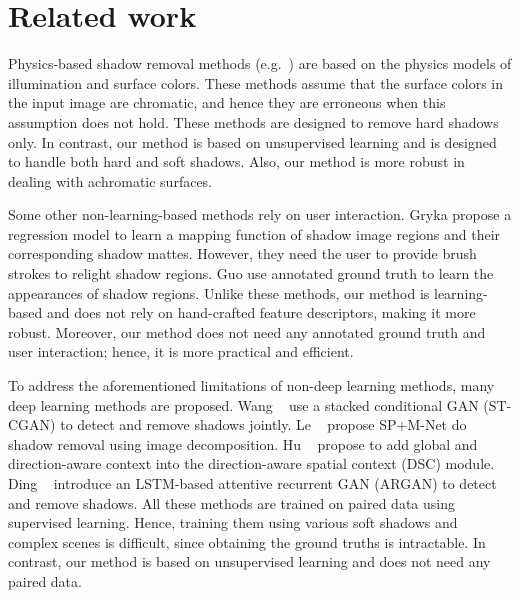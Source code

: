 \documentclass[10pt,twocolumn,letterpaper]{article}
\begin{document}
\section{Related work}
\label{sec:related}
Physics-based shadow removal methods (e.g.~\cite{Finlayson01,Drew03,Finlayson04,Finlayson05,Finlayson09}) are based on the physics models of illumination and surface colors. 
These methods assume that the surface colors in the input image are chromatic, and hence they are erroneous when this assumption does not hold. 
These methods are designed to remove hard shadows only. 
In contrast, our method is based on unsupervised learning and is designed to handle both hard and soft shadows. 
Also, our method is more robust in dealing with achromatic surfaces.

Some other non-learning-based methods rely on user interaction. Gryka \etal \cite{Gryka15} propose a regression model to learn a mapping function of shadow image regions and their corresponding shadow mattes. However, they need the user to provide brush strokes to relight shadow regions.  
Guo \etal \cite{Guo11,Guo12} use annotated ground truth to learn the appearances of shadow regions. 
Unlike these methods, our method is learning-based and does not rely on hand-crafted feature descriptors, making it more robust. Moreover, our method does not need any annotated ground truth and user interaction; hence, it is more practical and efficient.


To address the aforementioned limitations of non-deep learning methods, many deep learning methods are proposed. Wang \etal~\cite{Wang18} use a stacked conditional GAN (ST-CGAN) to detect and remove shadows jointly. 
Le \etal~\cite{Le19,le2020shadow} propose SP+M-Net do shadow removal using image decomposition.
Hu \etal~\cite{Hu18,hu2019direction} propose to add global and direction-aware context into the direction-aware spatial context (DSC) module.
Ding \etal~\cite{Ding19} introduce an LSTM-based attentive recurrent GAN (ARGAN) to detect and remove shadows. 
All these methods are trained on paired data using supervised learning. 
Hence, training them using various soft shadows and complex scenes is difficult, since obtaining the ground truths is intractable.
In contrast, our method is based on unsupervised learning and does not need any paired data. 
\end{document}
